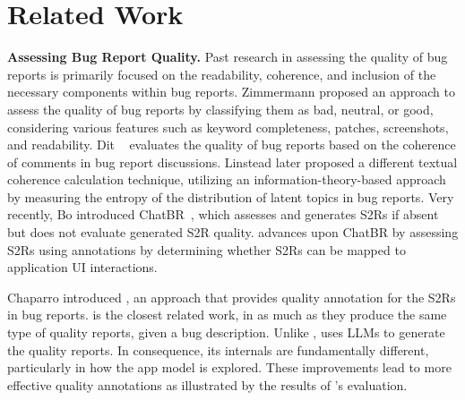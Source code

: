 \section{Related Work}
\label{sec:related_work}


\textbf{Assessing Bug Report Quality.} 
Past research in assessing the quality of bug reports is primarily focused on the readability, coherence, and inclusion of the necessary components within bug reports. Zimmermann \cite{Zimmermann2010} proposed an approach to assess the quality of bug reports by classifying them as bad, neutral, or good, considering various features such as keyword completeness, patches, screenshots, and readability.
Dit  \etal~\cite{Dit2008} evaluates the quality of bug reports based on the coherence of comments in bug report discussions.  
Linstead  \etal \cite{Linstead2009} later proposed a different textual coherence calculation technique, utilizing an information-theory-based approach by measuring the entropy of the distribution of latent topics in bug reports. 
Very recently, Bo  \etal introduced ChatBR~\cite{Bo2024}, which assesses and generates S2Rs if absent but does not evaluate generated S2R quality. \tool advances upon ChatBR by assessing S2Rs using annotations by determining whether S2Rs can be mapped to application UI interactions.

Chaparro  \etal \cite{Chaparro2019} introduced \EulerC, an approach that provides quality annotation for the S2Rs in bug reports.
\EulerC is the closest related work, in as much as they produce the same type of quality reports, given a bug description.
Unlike \EulerC, \tool uses LLMs to generate the quality reports. In consequence, its internals are fundamentally different, particularly in how the app model is explored. These improvements lead to more effective quality annotations as illustrated by the results of \tool's evaluation.  

